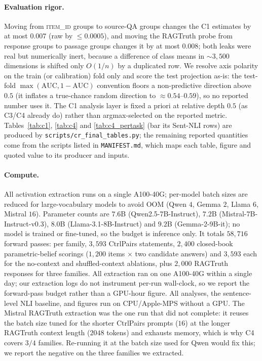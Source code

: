 \paragraph{Evaluation rigor.}
Moving from \textsc{item\_id} groups to source-QA groups changes the C1 estimates by at
most $0.007$ (raw by $\le0.0005$), and moving the RAGTruth probe from response groups to
passage groups changes it by at most $0.008$; both leaks were real but numerically
inert, because a difference of class means in ${\sim}3{,}500$ dimensions is shifted only
$O(1/n)$ by a duplicated row. We resolve axis polarity on the train (or calibration)
fold only and score the test projection as-is: the test-fold
$\max(\mathrm{AUC},1{-}\mathrm{AUC})$ convention floors a non-predictive direction above
$0.5$ (it inflates a true-chance random direction to $\approx0.54$--$0.59$), so no
reported number uses it. The C1 analysis layer is fixed a priori at relative depth $0.5$ (as C3/C4
already do) rather than argmax-selected on the reported metric. Tables~\ref{tab:c1}, \ref{tab:c4} and \ref{tab:c4_pertask} (bar its Sent-NLI rows) are
produced by \texttt{scripts/cr\_final\_tables.py}; the remaining reported quantities come from the
scripts listed in \texttt{MANIFEST.md}, which maps each table, figure and quoted value
to its producer and inputs.

\paragraph{Compute.}
All activation extraction runs on a single A100-40G; per-model batch sizes are reduced
for large-vocabulary models to avoid OOM (Qwen $4$, Gemma $2$, Llama $6$, Mistral
$16$). Parameter counts are $7.6$B (Qwen2.5-7B-Instruct), $7.2$B
(Mistral-7B-Instruct-v0.3), $8.0$B (Llama-3.1-8B-Instruct) and $9.2$B
(Gemma-2-9B-it); no model is trained or fine-tuned, so the budget is inference only.
It totals $58{,}716$ forward passes: per family, $3{,}593$ CtrlPairs statements,
$2{,}400$ closed-book parametric-belief scorings ($1{,}200$ items $\times$ two candidate
answers) and $3{,}593$ each for the no-context and shuffled-context ablations, plus
$2{,}000$ RAGTruth responses for three families. All extraction ran on one
A100-40G within a single day; our extraction logs do not instrument per-run wall-clock,
so we report the forward-pass budget rather than a GPU-hour figure.
All analyses, the sentence-level NLI baseline, and figures run on CPU/Apple-MPS
without a GPU. The Mistral RAGTruth extraction was the one run that did not complete:
it reuses the batch size tuned for the shorter CtrlPairs prompts ($16$) at the longer
RAGTruth context length ($2048$ tokens) and exhausts memory, which is why C4 covers
$3/4$ families. Re-running it at the batch size used for Qwen would fix this; we report
the negative on the three families we extracted.

